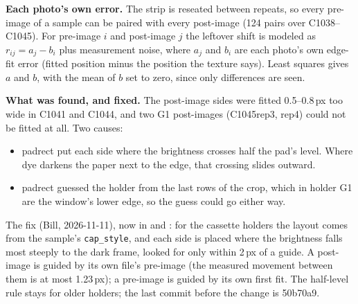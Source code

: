 \documentclass[11pt,letter]{article}
\newcommand{\file}[1]{\texttt{\seqsplit{#1}}}
\begin{document}
\textbf{Each photo's own error.}  The strip is reseated between repeats, so
every pre-image of a sample can be paired with every post-image (124 pairs
over C1038--C1045).  For pre-image $i$ and post-image $j$ the leftover shift
is modeled as $r_{ij} = a_j - b_i$ plus measurement noise, where $a_j$ and
$b_i$ are each photo's own edge-fit error (fitted position minus the
position the texture says).  Least squares gives $a$ and $b$, with the mean of
$b$ set to zero, since only differences are seen.

\textbf{What was found, and fixed.}  The post-image sides were fitted
0.5--0.8\,px too wide in C1041 and C1044, and two G1 post-images
(C1045rep3, rep4) could not be fitted at all.  Two causes:
\begin{itemize}
  \item padrect put each side where the brightness crosses half the pad's
    level.  Where dye darkens the paper next to the edge, that crossing
    slides outward.
  \item padrect guessed the holder from the last rows of the crop, which in
    holder G1 are the window's lower edge, so the guess could go either way.
\end{itemize}
The fix (Bill, 2026-11-11), now in \file{padrect.py} and
\file{analysis\_1.pad\_of}: for the cassette holders the layout comes from
the sample's \texttt{cap\_style}, and each side is placed where the
brightness falls most steeply to the dark frame, looked for only within
2\,px of a guide.  A post-image is guided by its own file's pre-image (the
measured movement between them is at most 1.23\,px); a pre-image is guided
by its own first fit.  The half-level rule stays for older holders; the
last commit before the change is 50b70a9.
\end{document}
